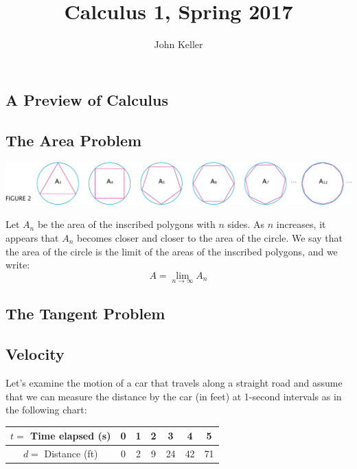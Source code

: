 \documentclass[11pt]{article}
\theoremstyle{plain}
\theoremstyle{definition}
\begin{document}
 


\title{Calculus 1, Spring 2017}
\author{John Keller}
\maketitle



\subsection{A Preview of Calculus}

\subsection{The Area Problem}

\includegraphics[width=\textwidth]{01-fig2.pdf}

Let $A_n$ be the area of the inscribed polygons with $n$ sides. As $n$ increases, it appears that $A_n$ becomes closer and closer to the area of the circle. We say that the area of the circle is the limit of the areas of the inscribed polygons, and we write: $$A=\lim_{n\to\infty} A_n$$

\subsection{The Tangent Problem}

\subsection{Velocity}

Let's examine the motion of a car that travels along a straight road and assume that we can measure the distance by the car (in feet) at 1-second intervals as in the following chart:

\begin{table}[h!]
\centering
 \begin{tabular}{|c|c|c|c|c|c|c|} 
 \hline
 $t=$ Time elapsed (s) & 0 & 1 & 2 & 3 & 4 & 5 \\
 \hline
 $d=$ Distance (ft) & 0 & 2 & 9 & 24 & 42 & 71 \\
 \hline
 \end{tabular}
\end{table}
\end{document}
